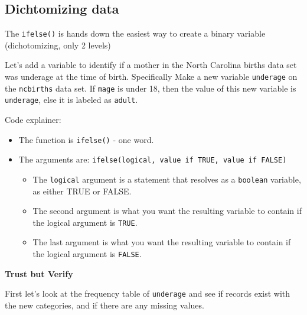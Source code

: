 \documentclass[
  letterpaper,
  DIV=11,
  numbers=noendperiod,
  oneside]{scrreprt}
\newenvironment{Shaded}{\begin{snugshade}}{\end{snugshade}}
\newcommand{\DecValTok}[1]{\textcolor[rgb]{0.68,0.00,0.00}{#1}}
\newcommand{\FunctionTok}[1]{\textcolor[rgb]{0.28,0.35,0.67}{#1}}
\newcommand{\NormalTok}[1]{\textcolor[rgb]{0.00,0.23,0.31}{#1}}
\newcommand{\OtherTok}[1]{\textcolor[rgb]{0.00,0.23,0.31}{#1}}
\newcommand{\SpecialCharTok}[1]{\textcolor[rgb]{0.37,0.37,0.37}{#1}}
\newcommand{\StringTok}[1]{\textcolor[rgb]{0.13,0.47,0.30}{#1}}
\providecommand{\tightlist}{%
  \setlength{\itemsep}{0pt}\setlength{\parskip}{0pt}}\usepackage{longtable,booktabs,array}
\begin{document}
\subsection{Dichtomizing data}\label{dichtomizing-data}

The \texttt{ifelse()} is hands down the easiest way to create a binary
variable (dichotomizing, only 2 levels)

Let's add a variable to identify if a mother in the North Carolina
births data set was underage at the time of birth. Specifically Make a
new variable \texttt{underage} on the \texttt{ncbirths} data set. If
\texttt{mage} is under 18, then the value of this new variable is
\texttt{underage}, else it is labeled as \texttt{adult}.

\begin{Shaded}
\end{Shaded}

Code explainer:

\begin{itemize}
\tightlist
\item
  The function is \texttt{ifelse()} - one word.
\item
  The arguments are:
  \texttt{ifelse(logical,\ value\ if\ TRUE,\ value\ if\ FALSE)}

  \begin{itemize}
  \tightlist
  \item
    The \texttt{logical} argument is a statement that resolves as a
    \texttt{boolean} variable, as either TRUE or FALSE.
  \item
    The second argument is what you want the resulting variable to
    contain if the logical argument is \texttt{TRUE}.
  \item
    The last argument is what you want the resulting variable to contain
    if the logical argument is \texttt{FALSE}.
  \end{itemize}
\end{itemize}

\textbf{Trust but Verify}

First let's look at the frequency table of \texttt{underage} and see if
records exist with the new categories, and if there are any missing
values.
\end{document}
